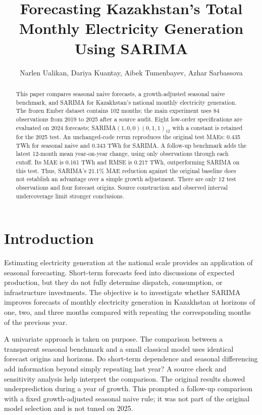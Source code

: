 \documentclass[11pt,a4paper,twoside,reqno]{amsart}
\title[Monthly electricity generation in Kazakhstan]{Forecasting Kazakhstan's Total Monthly Electricity Generation Using SARIMA}
\author[Ualikan, Kuantay, Tumenbayev and Sarbassova]{Narlen Ualikan, Dariya Kuantay, Aibek Tumenbayev, Azhar Sarbassova}
\date{}
\numberwithin{equation}{section}
\begin{document}
\begin{abstract}
This paper compares seasonal naive forecasts, a growth-adjusted seasonal naive benchmark, and SARIMA for Kazakhstan's national monthly electricity generation. The frozen Ember dataset contains 102 months; the main experiment uses 84 observations from 2019 to 2025 after a source audit. Eight low-order specifications are evaluated on 2024 forecasts; SARIMA$(1,0,0)(0,1,1)_{12}$ with a constant is retained for the 2025 test. An unchanged-code rerun reproduces the original test MAEs: 0.435 TWh for seasonal naive and 0.343 TWh for SARIMA. A follow-up benchmark adds the latest 12-month mean year-on-year change, using only observations through each cutoff. Its MAE is 0.161 TWh and RMSE is 0.217 TWh, outperforming SARIMA on this test. Thus, SARIMA's 21.1\% MAE reduction against the original baseline does not establish an advantage over a simple growth adjustment. There are only 12 test observations and four forecast origins. Source construction and observed interval undercoverage limit stronger conclusions.
\end{abstract}
\maketitle
\section{Introduction}

Estimating electricity generation at the national scale provides an application of seasonal forecasting. Short-term forecasts feed into discussions of expected production, but they do not fully determine dispatch, consumption, or infrastructure investments. The objective is to investigate whether SARIMA improves forecasts of monthly electricity generation in Kazakhstan at horizons of one, two, and three months compared with repeating the corresponding months of the previous year.\par

A univariate approach is taken on purpose. The comparison between a transparent seasonal benchmark and a small classical model uses identical forecast origins and horizons. Do short-term dependence and seasonal differencing add information beyond simply repeating last year? A source check and sensitivity analysis help interpret the comparison. The original results showed underprediction during a year of growth. This prompted a follow-up comparison with a fixed growth-adjusted seasonal naive rule; it was not part of the original model selection and is not tuned on 2025.\par
\end{document}
